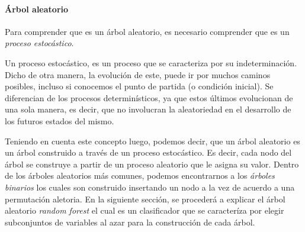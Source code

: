 \paragraph{Árbol aleatorio}

	Para comprender que es un árbol aleatorio, es necesario comprender que es un \textit{proceso estocástico}.

	Un proceso estocástico, es un proceso que se caracteriza por su indeterminación. Dicho de otra manera, la evolución de este, puede ir por muchos caminos posibles, incluso si conocemos el punto de partida (o condición inicial). Se diferencian de los procesos determinísticos, ya que estos últimos evolucionan de una sola manera, es decir, que no involucran la aleatoriedad en el desarrollo de los futuros estados del mismo.

	Teniendo en cuenta este concepto luego, podemos decir, que un árbol aleatorio es un árbol construido a través de un proceso estocástico. Es decir, cada nodo del árbol se construye a partir de un proceso aleatorio que le asigna su valor. Dentro de los árboles aleatorios más comunes, podemos encontrarnos a  los \textit{árboles binarios} los cuales son construido insertando un nodo a la vez de acuerdo a una permutación aletoria. En la siguiente sección, se procederá a explicar el árbol aleatorio \textit{random forest} el cual es un clasificador que se caracteríza por elegir subconjuntos de variables al azar para la construcción de cada árbol.


